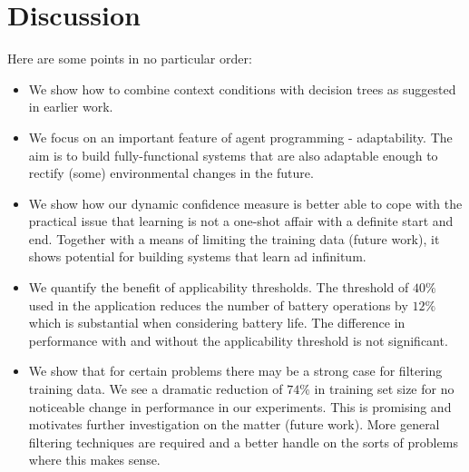 \section{Discussion}\label{sec:discussion}

Here are some points in no particular order:

\begin{itemize}

\item We show how to combine context conditions with decision trees as suggested in earlier work.

\item We focus on an important feature of agent programming - adaptability. The aim is to build fully-functional systems that are also adaptable enough to rectify (some) environmental changes in the future. 

\item We show how our dynamic confidence measure is better able to cope with the practical issue that learning is not a one-shot affair with a definite start and end. Together with a means of limiting the training data (future work), it shows potential for building systems that learn ad infinitum.

\item We quantify the benefit of applicability thresholds. The threshold of $40\%$ used in the application reduces the number of battery operations by $12\%$ which is substantial when considering battery life. The difference in performance with and without the applicability threshold is not significant.

\item We show that for certain problems there may be a strong case for filtering training data. We see a dramatic reduction of $74\%$ in training set size for no noticeable change in performance in our experiments. This is promising and motivates further investigation on the matter (future work). More general filtering techniques are required and a better handle on the sorts of problems where this makes sense. 

\end{itemize}
